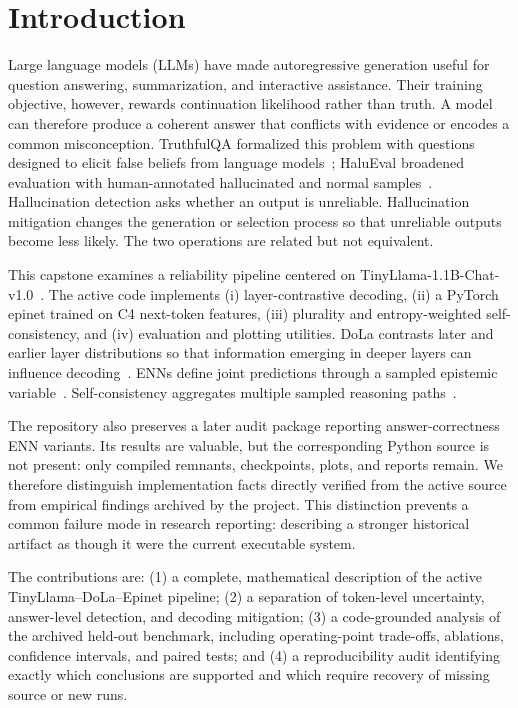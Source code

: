 \documentclass[conference]{IEEEtran}
\begin{document}
\section{Introduction}
Large language models (LLMs) have made autoregressive generation useful for question answering, summarization, and interactive assistance. Their training objective, however, rewards continuation likelihood rather than truth. A model can therefore produce a coherent answer that conflicts with evidence or encodes a common misconception. TruthfulQA formalized this problem with questions designed to elicit false beliefs from language models~\cite{lin2022truthfulqa}; HaluEval broadened evaluation with human-annotated hallucinated and normal samples~\cite{li2023halueval}. Hallucination detection asks whether an output is unreliable. Hallucination mitigation changes the generation or selection process so that unreliable outputs become less likely. The two operations are related but not equivalent.

This capstone examines a reliability pipeline centered on TinyLlama-1.1B-Chat-v1.0~\cite{zhang2024tinyllama}. The active code implements (i) layer-contrastive decoding, (ii) a PyTorch epinet trained on C4 next-token features, (iii) plurality and entropy-weighted self-consistency, and (iv) evaluation and plotting utilities. DoLa contrasts later and earlier layer distributions so that information emerging in deeper layers can influence decoding~\cite{chuang2024dola}. ENNs define joint predictions through a sampled epistemic variable~\cite{osband2021enn}. Self-consistency aggregates multiple sampled reasoning paths~\cite{wang2023selfconsistency}.

The repository also preserves a later audit package reporting answer-correctness ENN variants. Its results are valuable, but the corresponding Python source is not present: only compiled remnants, checkpoints, plots, and reports remain. We therefore distinguish implementation facts directly verified from the active source from empirical findings archived by the project. This distinction prevents a common failure mode in research reporting: describing a stronger historical artifact as though it were the current executable system.

The contributions are: (1) a complete, mathematical description of the active TinyLlama--DoLa--Epinet pipeline; (2) a separation of token-level uncertainty, answer-level detection, and decoding mitigation; (3) a code-grounded analysis of the archived held-out benchmark, including operating-point trade-offs, ablations, confidence intervals, and paired tests; and (4) a reproducibility audit identifying exactly which conclusions are supported and which require recovery of missing source or new runs.
\end{document}

